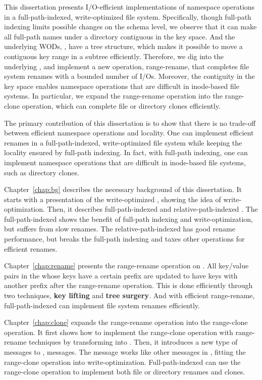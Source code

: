 This dissertation presents I/O-efficient implementations of namespace operations
in a full-path-indexed, write-optimized file system.
Specifically, though full-path indexing limits possible changes on the schema
level, we observe that it can make all full-path names under a directory
contiguous in the key space.
And the underlying WODs, \bets, have a tree structure, which makes it possible
to move a contiguous key range in a subtree efficiently.
Therefore, we dig into the underlying \bets, and implement a new operation,
range-rename, that completes file system renames with a bounded number of I/Os.
Moreover, the contiguity in the key space enables namespace operations that are
difficult in inode-based file systems.
In particular, we expand the range-rename operation into the range-clone
operation, which can complete file or directory clones efficiently.

The primary contribution of this dissertation is to show that there is no
trade-off between efficient namespace operations and locality.
One can implement efficient renames in a full-path-indexed, write-optimized
file system while keeping the locality ensured by full-path indexing.
In fact, with full-path indexing, one can implement namespace operations that
are difficult in inode-based file systems, such as directory clones.

Chapter~\ref{chap:bg} describes the necessary background of this dissertation.
It starts with a presentation of the write-optimized \bets,
showing the idea of write-optimization.
Then, it describes full-path-indexed \betrfs and relative-path-indexed \betrfs.
The full-path-indexed \betrfs shows the benefit of full-path indexing and
write-optimization, but suffers from slow renames.
The relative-path-indexed \betrfs has good rename performance, but breaks the
full-path indexing and taxes other operations for efficient renames.

Chapter~\ref{chap:rename} presents the range-rename operation on \bets.
All key/value pairs in the \bet whose keys have a certain prefix are updated to
have keys with another prefix after the range-rename operation.
This is done efficiently through two techniques,
\textbf{key lifting} and \textbf{tree surgery}.
And with efficient range-rename, full-path-indexed \betrfs can implement file
system renames efficiently.

Chapter~\ref{chap:clone} expands the range-rename operation into the
range-clone operation.
It first shows how to implement the range-clone operation with range-rename
techniques by transforming \bets into \bedags.
Then, it introduces a new type of messages to \bedags, \goto messages.
The \goto message works like other messages in \bedags,
fitting the range-clone operation into write-optimization.
Full-path-indexed \betrfs can use the range-clone operation to implement both
file or directory renames and clones.

